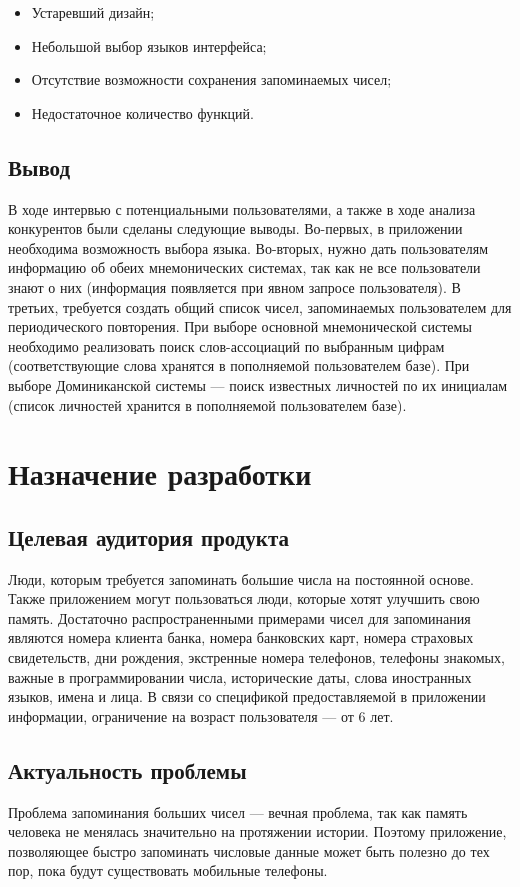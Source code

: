 \documentclass[draft]{article}
\begin{document}
\begin{itemize}
\item Устаревший дизайн;
\item Небольшой выбор языков интерфейса;
\item Отсутствие возможности сохранения запоминаемых чисел;
\item Недостаточное количество функций.
\end{itemize}
\begin{center}
\subsection{Вывод}
\end{center}
В ходе интервью с потенциальными пользователями, а также в ходе анализа конкурентов были сделаны следующие выводы. Во-первых, в приложении необходима возможность выбора языка. Во-вторых, нужно дать пользователям информацию об обеих мнемонических системах, так как не все пользователи знают о них (информация появляется при явном запросе пользователя). В третьих, требуется создать общий список чисел, запоминаемых пользователем для периодического повторения. При выборе основной мнемонической системы необходимо реализовать поиск слов-ассоциаций по выбранным цифрам (соответствующие слова хранятся в пополняемой пользователем базе). При выборе Доминиканской системы — поиск известных личностей по их инициалам (список личностей хранится в пополняемой пользователем базе).\\
\newpage
\section {Назначение разработки}
\subsection{Целевая аудитория продукта}
Люди, которым требуется запоминать большие числа на постоянной основе. Также приложением могут пользоваться люди, которые хотят улучшить свою память. Достаточно распространенными примерами чисел для запоминания являются номера клиента банка, номера банковских карт, номера страховых свидетельств, дни рождения, экстренные номера телефонов, телефоны знакомых, важные в программировании числа, исторические даты, слова иностранных языков, имена и лица. В связи со спецификой предоставляемой в приложении информации, ограничение на возраст пользователя — от 6 лет.
\subsection{Актуальность проблемы}
Проблема запоминания больших чисел — вечная проблема, так как память человека не менялась значительно на протяжении истории. Поэтому приложение, позволяющее быстро запоминать числовые данные может быть полезно до тех пор, пока будут существовать мобильные телефоны.
\end{document}
